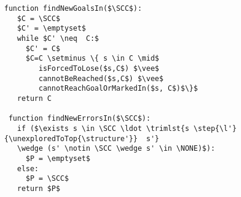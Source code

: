 \begin{lstlisting}[language={pseudocode},label={lst:dcs.gather},caption={Status confirmation.},float=ht, frame=single]
 function findNewGoalsIn($\SCC$):
   $C = \SCC$
   $C' = \emptyset$
   while $C' \neq  C:$
     $C' = C$
     $C=C \setminus \{ s \in C \mid$ 
        isForcedToLose($s,C$) $\vee$
     	cannotBeReached($s,C$) $\vee$
     	cannotReachGoalOrMarkedIn($s, C$)$\}$
   return C
  
 function findNewErrorsIn($\SCC$):
   if ($\exists s \in \SCC \ldot \trimlst{s \step{\l'}{\unexploredToTop{\structure'}}  s'} 
   \wedge (s' \notin \SCC \wedge s' \in \NONE)$):
     $P = \emptyset$
   else: 
     $P = \SCC$
   return $P$
\end{lstlisting}




